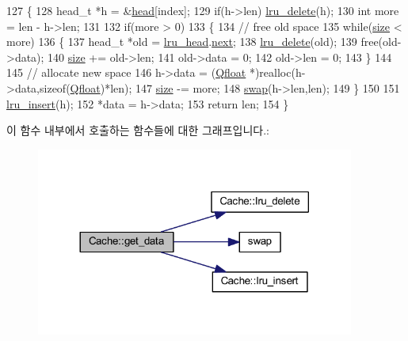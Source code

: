 \begin{DoxyCode}
127 \{
128     head\_t *h = &\hyperlink{class_cache_aaf3674e8de1e3896dba64b4caac79f0a}{head}[index];
129     \textcolor{keywordflow}{if}(h->len) \hyperlink{class_cache_ab83abc6ded621fa2575e3a44421e0cb4}{lru\_delete}(h);
130     \textcolor{keywordtype}{int} more = len - h->len;
131 
132     \textcolor{keywordflow}{if}(more > 0)
133     \{
134         \textcolor{comment}{// free old space}
135         \textcolor{keywordflow}{while}(\hyperlink{class_cache_af50a89d0734a160cf812384df64599f9}{size} < more)
136         \{
137             head\_t *old = \hyperlink{class_cache_a91fc6bd9c69ed37e8e0499da8d47794e}{lru\_head}.\hyperlink{struct_cache_1_1head__t_aa152a104ec07250949c234d164f5f3fd}{next};
138             \hyperlink{class_cache_ab83abc6ded621fa2575e3a44421e0cb4}{lru\_delete}(old);
139             free(old->data);
140             \hyperlink{class_cache_af50a89d0734a160cf812384df64599f9}{size} += old->len;
141             old->data = 0;
142             old->len = 0;
143         \}
144 
145         \textcolor{comment}{// allocate new space}
146         h->data = (\hyperlink{svm_8cpp_a8755d90a54ecfb8d15051af3e0542592}{Qfloat} *)realloc(h->data,\textcolor{keyword}{sizeof}(\hyperlink{svm_8cpp_a8755d90a54ecfb8d15051af3e0542592}{Qfloat})*len);
147         \hyperlink{class_cache_af50a89d0734a160cf812384df64599f9}{size} -= more;
148         \hyperlink{svm_8cpp_a91e77fa16b1c9bbbf90f2eea392997b1}{swap}(h->len,len);
149     \}
150 
151     \hyperlink{class_cache_a51e5ffc28e2ec6662ae13ab78ccc2243}{lru\_insert}(h);
152     *data = h->data;
153     \textcolor{keywordflow}{return} len;
154 \}
\end{DoxyCode}


이 함수 내부에서 호출하는 함수들에 대한 그래프입니다.\+:
\nopagebreak
\begin{figure}[H]
\begin{center}
\leavevmode
\includegraphics[width=296pt]{class_cache_aca49263fb34641e208884cc223b25317_cgraph}
\end{center}
\end{figure}





